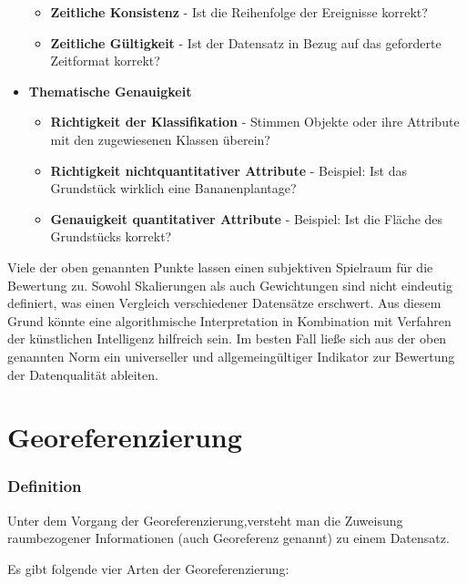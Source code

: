 \documentclass[11pt,ceqn]{book}
\begin{document}
\begin{itemize}
\begin{itemize}
\item \textbf{Zeitliche Konsistenz} - Ist die Reihenfolge der Ereignisse korrekt?
\item
\textbf{Zeitliche Gültigkeit} - Ist der Datensatz in Bezug auf das geforderte Zeitformat korrekt?
\end{itemize}
\item \textbf{Thematische Genauigkeit}
\begin{itemize}
\item
\textbf{Richtigkeit der Klassifikation} - Stimmen Objekte oder ihre Attribute mit den zugewiesenen Klassen überein?
\item \textbf{Richtigkeit nichtquantitativer Attribute} - Beispiel: Ist das Grundstück wirklich eine Bananenplantage?
\item \textbf{Genauigkeit quantitativer Attribute} - Beispiel: Ist die Fläche des Grundstücks korrekt?
\end{itemize}
\end{itemize}

Viele der oben genannten Punkte lassen einen subjektiven Spielraum für die Bewertung zu. Sowohl Skalierungen als auch Gewichtungen sind nicht eindeutig definiert, was einen Vergleich verschiedener Datensätze erschwert. Aus diesem Grund könnte eine algorithmische Interpretation in Kombination mit Verfahren der künstlichen Intelligenz hilfreich sein. Im besten Fall ließe sich aus der oben genannten Norm ein universeller und allgemeingültiger Indikator zur Bewertung der Datenqualität ableiten.


\section{Georeferenzierung}
\subsubsection{Definition}
Unter dem Vorgang der Georeferenzierung,versteht man die Zuweisung raumbezogener Informationen (auch Georeferenz genannt) zu einem Datensatz.

Es gibt folgende vier Arten der Georeferenzierung:
\end{document}
